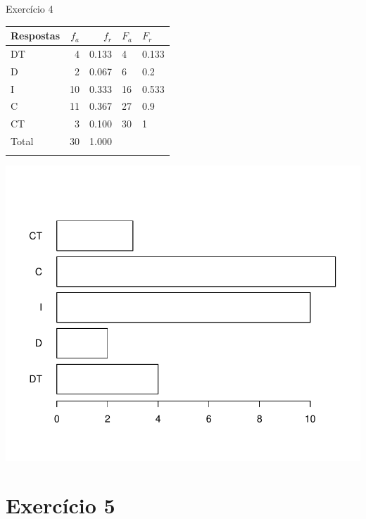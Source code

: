 \documentclass[
  ignorenonframetext,
  serif,
  professionalfont,
  usenames,
  dvipsnames,
  aspectratio = 169]{beamer}
\def\beginAHalfColumn{\begin{minipage}{0.49\textwidth}}%
\def\endColumns{\end{minipage}}%
\begin{document}
\begin{frame}{Exercício 4}
\label{exercuxedcio-4-3}
\beginAHalfColumn

\begin{longtable}[]{@{}lrrll@{}}
\toprule\noalign{}
Respostas & \(f_a\) & \(f_r\) & \(F_{a}\) & \(F_{r}\) \\
\midrule\noalign{}
\endhead
DT & 4 & 0.133 & 4 & 0.133 \\
D & 2 & 0.067 & 6 & 0.2 \\
I & 10 & 0.333 & 16 & 0.533 \\
C & 11 & 0.367 & 27 & 0.9 \\
CT & 3 & 0.100 & 30 & 1 \\
Total & 30 & 1.000 & & \\
\bottomrule\noalign{}
\end{longtable}

\endColumns
\beginAHalfColumn

\begin{center}\includegraphics[width=0.9\linewidth]{exercicios-encontro1-solucao_files/figure-beamer/unnamed-chunk-13-1} \end{center}

\endColumns
\end{frame}

\section{Exercício 5}\label{exercuxedcio-5}
\end{document}

